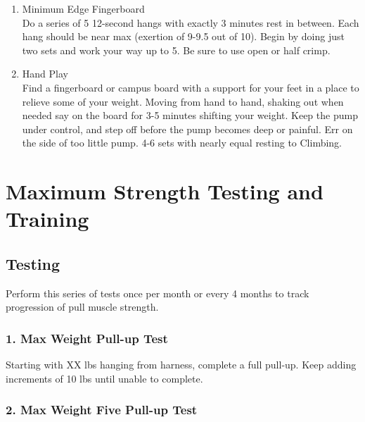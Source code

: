 \documentclass[12pt, letterpaper]{article}
\begin{document}
\begin{enumerate}
      
       \item Minimum Edge Fingerboard \\ 
            Do a series of 5 12-second hangs with exactly 3 minutes rest in between. 
            Each hang should be near max (exertion of 9-9.5 out of 10). Begin by 
            doing just two sets and work your way up to 5. Be sure to use open or half crimp. 

       \item Hand Play \\ 
            Find a fingerboard or campus board with a support for your feet in a place to 
            relieve some of your weight. Moving from hand to hand, shaking out when needed 
            say on the board for 3-5 minutes shifting your weight. Keep the pump under
            control, and step off before the pump becomes deep or painful. Err on the side
            of too little pump. 4-6 sets with nearly equal resting to Climbing.

\end{enumerate}

\newpage %


\section{Maximum Strength Testing and Training}

\subsection{Testing}
Perform this series of tests once per month or every 4 months to track progression
of pull muscle strength.

\subsubsection{1. Max Weight Pull-up Test}

Starting with XX lbs hanging from harness, complete a full pull-up.
Keep adding increments of 10 lbs until unable to complete. 

\subsubsection{2. Max Weight Five Pull-up Test}
\end{document}
